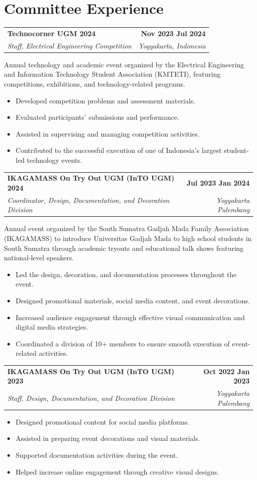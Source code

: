 \documentclass[a4paper,10pt]{article}
\makeatletter
\newcommand{\entry}[4]{%
  \begin{tabularx}{\linewidth}{@{}X r@{}}
    \textbf{#1} & \hspace{1em}\textbf{#4} \\
    \textit{#3} & \hspace{1em}\textit{\small #2} \\
  \end{tabularx}\par\vspace{1pt}%
}
\newcommand{\about}[1]{{\small\color{darkgray}#1}\par}
\newcommand{\entrygap}{\vspace{6pt}}
\makeatother
\begin{document}
\section{Committee Experience}
\entry{Technocorner UGM 2024}{Yogyakarta, Indonesia}
      {Staff, Electrical Engineering Competition}{Nov 2023 \textendash{} Jul 2024}
\about{Annual technology and academic event organized by the Electrical Engineering
and Information Technology Student Association (KMTETI), featuring competitions,
exhibitions, and technology-related programs.}
\begin{itemize}
  \item Developed competition problems and assessment materials.
  \item Evaluated participants' submissions and performance.
  \item Assisted in supervising and managing competition activities.
  \item Contributed to the successful execution of one of Indonesia's largest student-led technology events.
\end{itemize}
\entrygap

\entry{IKAGAMASS On Try Out UGM (InTO UGM) 2024}{Yogyakarta \textendash{} Palembang}
      {Coordinator, Design, Documentation, and Decoration Division}{Jul 2023 \textendash{} Jan 2024}
\about{Annual event organized by the South Sumatra Gadjah Mada Family Association
(IKAGAMASS) to introduce Universitas Gadjah Mada to high school students in South
Sumatra through academic tryouts and educational talk shows featuring
national-level speakers.}
\begin{itemize}
  \item Led the design, decoration, and documentation processes throughout the event.
  \item Designed promotional materials, social media content, and event decorations.
  \item Increased audience engagement through effective visual communication and digital media strategies.
  \item Coordinated a division of 10+ members to ensure smooth execution of event-related activities.
\end{itemize}
\entrygap

\entry{IKAGAMASS On Try Out UGM (InTO UGM) 2023}{Yogyakarta \textendash{} Palembang}
      {Staff, Design, Documentation, and Decoration Division}{Oct 2022 \textendash{} Jan 2023}
\begin{itemize}
  \item Designed promotional content for social media platforms.
  \item Assisted in preparing event decorations and visual materials.
  \item Supported documentation activities during the event.
  \item Helped increase online engagement through creative visual designs.
\end{itemize}
\end{document}
